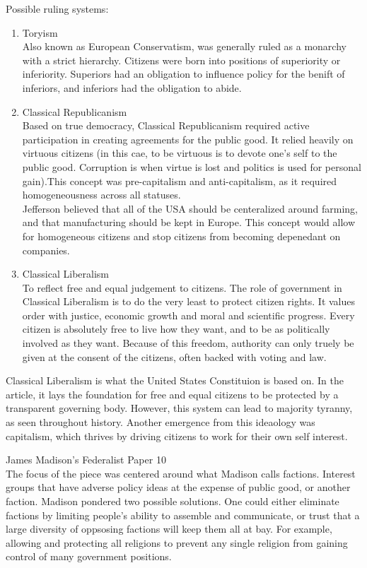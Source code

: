 \documentclass{article}
\begin{document}
Possible ruling systems:
\begin{enumerate}
  \item Toryism\\ Also known as European Conservatism, was generally ruled as a monarchy with a strict hierarchy. Citizens were born into positions of superiority or inferiority. Superiors had an obligation to influence policy for the benift of inferiors, and inferiors had the obligation to abide.
  \item Classical Republicanism\\ Based on true democracy, Classical Republicanism required active participation in creating agreements for the public good. It relied heavily on virtuous citizens (in this cae, to be virtuous is to devote one's self to the public good. Corruption is when virtue is lost and politics is used for personal gain).This concept was pre-capitalism and anti-capitalism, as it required homogeneousness across all statuses.\\ Jefferson believed that all of the USA should be centeralized around farming, and that manufacturing should be kept in Europe. This concept would allow for homogeneous citizens and stop citizens from becoming depenedant on companies.
  \item Classical Liberalism\\ To reflect free and equal judgement to citizens. The role of government in Classical Liberalism is to do the very least to protect citizen rights. It values order with justice, economic growth and moral and scientific progress. Every citizen is absolutely free to live how they want, and to be as politically involved as they want. Because of this freedom, authority can only truely be given at the consent of the citizens, often backed with voting and law.
\end{enumerate}

\indent
Classical Liberalism is what the United States Constituion is based on. In the article, it lays the foundation for free and equal citizens to be protected by a transparent governing body. However, this system can lead to majority tyranny, as seen throughout history. Another emergence from this ideaology was capitalism, which thrives by driving citizens to work for their own self interest.

\noindent
\Large James Madison's Federalist Paper 10\\
\normalsize
\indent
The focus of the piece was centered around what Madison calls factions. Interest groups that have adverse policy ideas at the expense of public good, or another faction. Madison pondered two possible solutions. One could either eliminate factions by limiting people's ability to assemble and communicate, or trust that a large diversity of oppsosing factions will keep them all at bay. For example, allowing and protecting all religions to prevent any single religion from gaining control of many government positions.
\end{document}
